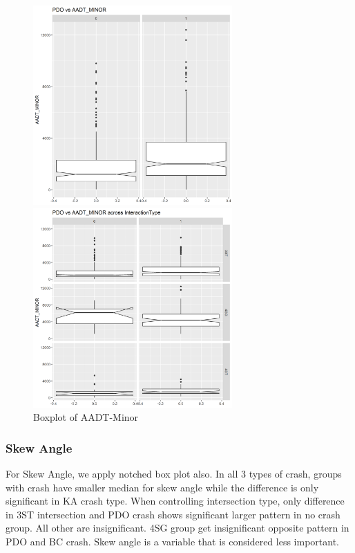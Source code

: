 \documentclass[11pt]{scrartcl} %
\begin{document}
\begin{figure}[H]
\begin{minipage}[t]{0.5\linewidth}
\centering
\includegraphics[width=3in]{image/minor_all_pdo.png}
\small
\end{minipage}
\begin{minipage}[t]{0.5\linewidth}
\centering
\includegraphics[width=3in]{image/minor_pdo.png}
\small
\end{minipage}
\caption{Boxplot of AADT-Minor}
\end{figure}

\subsubsection{Skew Angle}

For Skew Angle, we apply notched box plot also. In all 3 types of crash, groups with crash have smaller median for skew angle while the difference is only significant in KA crash type. When controlling intersection type, only difference in 3ST intersection and PDO crash shows significant larger pattern in no crash group. All other are insignificant. 4SG group get insignificant opposite pattern in PDO and BC crash. Skew angle is a variable that is considered less important.
\end{document}
